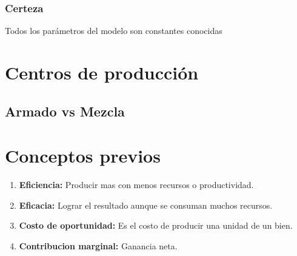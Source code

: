 \documentclass[12pt]{book}
\begin{document}
\subsubsection{Certeza}Todos los parámetros del modelo son constantes conocidas

\section{Centros de producción}
\subsection{Armado vs Mezcla}

\section{Conceptos previos}
\begin{enumerate}
	\item \textbf{Eficiencia:} Producir mas con menos recursos o productividad.
	\item \textbf{Eficacia:} Lograr el resultado aunque se consuman muchos recursos.
	\item \textbf{Costo de oportunidad:} Es el costo de producir una unidad de un bien.
	\item \textbf{Contribucion marginal:} Ganancia neta.
\end{enumerate}
\end{document}

